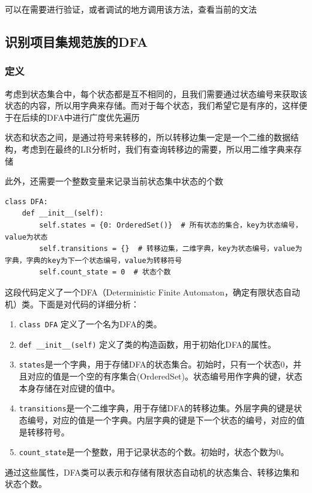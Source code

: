 \documentclass[lang=cn,11pt,a4paper]{elegantpaper}
\begin{document}
可以在需要进行验证，或者调试的地方调用该方法，查看当前的文法

\subsection{识别项目集规范族的DFA}

\subsubsection{定义}

考虑到状态集合中，每个状态都是互不相同的，且我们需要通过状态编号来获取该状态的内容，所以用字典来存储。而对于每个状态，我们希望它是有序的，这样便于在后续的DFA中进行广度优先遍历

状态和状态之间，是通过符号来转移的，所以转移边集一定是一个二维的数据结构，考虑到在最终的LR分析时，我们有查询转移边的需要，所以用二维字典来存储

此外，还需要一个整数变量来记录当前状态集中状态的个数

\begin{lstlisting}
class DFA:
    def __init__(self):
        self.states = {0: OrderedSet()}  # 所有状态的集合，key为状态编号，value为状态
        self.transitions = {}  # 转移边集，二维字典，key为状态编号，value为字典，字典的key为下一个状态编号，value为转移符号
        self.count_state = 0  # 状态个数
\end{lstlisting}

这段代码定义了一个DFA（Deterministic Finite Automaton，确定有限状态自动机）类。下面是对代码的详细分析：
\begin{enumerate}
    \item \lstinline{class DFA} 定义了一个名为DFA的类。
    \item \lstinline{def __init__(self)} 定义了类的构造函数，用于初始化DFA的属性。
    \item \lstinline{states}是一个字典，用于存储DFA的状态集合。初始时，只有一个状态0，并且对应的值是一个空的有序集合(OrderedSet)。状态编号用作字典的键，状态本身存储在对应键的值中。
    \item \lstinline{transitions}是一个二维字典，用于存储DFA的转移边集。外层字典的键是状态编号，对应的值是一个字典。内层字典的键是下一个状态的编号，对应的值是转移符号。
    \item \lstinline{count_state}是一个整数，用于记录状态的个数。初始时，状态个数为0。
\end{enumerate}

通过这些属性，DFA类可以表示和存储有限状态自动机的状态集合、转移边集和状态个数。
\end{document}
